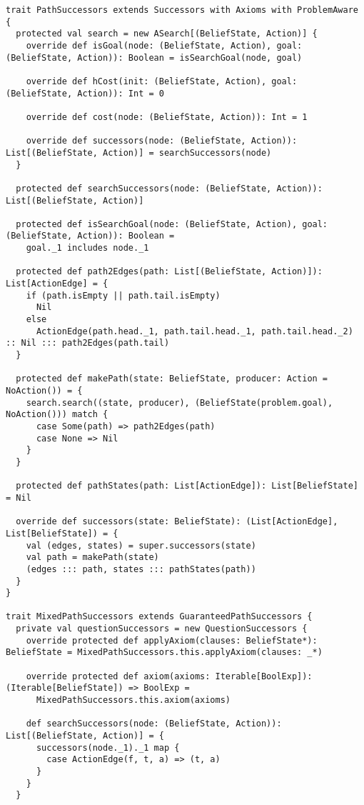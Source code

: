 \begin{lstlisting}[caption=Path Successors, label=source_pathsc]
trait PathSuccessors extends Successors with Axioms with ProblemAware {
  protected val search = new ASearch[(BeliefState, Action)] {
    override def isGoal(node: (BeliefState, Action), goal: (BeliefState, Action)): Boolean = isSearchGoal(node, goal)

    override def hCost(init: (BeliefState, Action), goal: (BeliefState, Action)): Int = 0

    override def cost(node: (BeliefState, Action)): Int = 1

    override def successors(node: (BeliefState, Action)): List[(BeliefState, Action)] = searchSuccessors(node)
  }

  protected def searchSuccessors(node: (BeliefState, Action)): List[(BeliefState, Action)]

  protected def isSearchGoal(node: (BeliefState, Action), goal: (BeliefState, Action)): Boolean =
    goal._1 includes node._1

  protected def path2Edges(path: List[(BeliefState, Action)]): List[ActionEdge] = {
    if (path.isEmpty || path.tail.isEmpty)
      Nil
    else
      ActionEdge(path.head._1, path.tail.head._1, path.tail.head._2) :: Nil ::: path2Edges(path.tail)
  }

  protected def makePath(state: BeliefState, producer: Action = NoAction()) = {
    search.search((state, producer), (BeliefState(problem.goal), NoAction())) match {
      case Some(path) => path2Edges(path)
      case None => Nil
    }
  }

  protected def pathStates(path: List[ActionEdge]): List[BeliefState] = Nil

  override def successors(state: BeliefState): (List[ActionEdge], List[BeliefState]) = {
    val (edges, states) = super.successors(state)
    val path = makePath(state)
    (edges ::: path, states ::: pathStates(path))
  }
}

trait MixedPathSuccessors extends GuaranteedPathSuccessors {
  private val questionSuccessors = new QuestionSuccessors {
    override protected def applyAxiom(clauses: BeliefState*): BeliefState = MixedPathSuccessors.this.applyAxiom(clauses: _*)

    override protected def axiom(axioms: Iterable[BoolExp]): (Iterable[BeliefState]) => BoolExp =
      MixedPathSuccessors.this.axiom(axioms)

    def searchSuccessors(node: (BeliefState, Action)): List[(BeliefState, Action)] = {
      successors(node._1)._1 map {
        case ActionEdge(f, t, a) => (t, a)
      }
    }
  }


\end{lstlisting}
